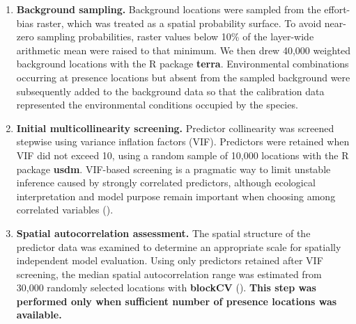 \documentclass[
  openany]{book}
\let\OldTexttt\texttt
\renewcommand{\texttt}[1]{%
  \OldTexttt{\small #1}%
}
\begin{document}
\begin{enumerate}
  \begin{enumerate}
  \def\labelenumii{\alph{enumii}.}
  \item
    Seasonal overlap between the focal species and each target-group species was quantified with \texttt{phenology\_overlap\_weights()}.
  \item
    Overlap between focal-species observation activity and grassland habitat-inventory dates was quantified with \texttt{doy\_kde\_weights()}.
  \item
    After applying target-group-specific temporal weights, group-specific sampling-density surfaces were generated with \texttt{kde\_surface()}. These functions are implemented in the R package \textbf{sdmhelpers} ().
  \end{enumerate}
\item
  \textbf{Background sampling.} Background locations were sampled from the effort-bias raster, which was treated as a spatial probability surface. To avoid near-zero sampling probabilities, raster values below 10\% of the layer-wide arithmetic mean were raised to that minimum. We then drew 40,000 weighted background locations with the R package \textbf{terra}. Environmental combinations occurring at presence locations but absent from the sampled background were subsequently added to the background data so that the calibration data represented the environmental conditions occupied by the species.
\item
  \textbf{Initial multicollinearity screening.} Predictor collinearity was screened stepwise using variance inflation factors (VIF). Predictors were retained when VIF did not exceed 10, using a random sample of 10,000 locations with the R package \textbf{usdm}. VIF-based screening is a pragmatic way to limit unstable inference caused by strongly correlated predictors, although ecological interpretation and model purpose remain important when choosing among correlated variables ().
\item
  \textbf{Spatial autocorrelation assessment.} The spatial structure of the predictor data was examined to determine an appropriate scale for spatially independent model evaluation. Using only predictors retained after VIF screening, the median spatial autocorrelation range was estimated from 30,000 randomly selected locations with \textbf{blockCV} (). \textbf{This step was performed only when sufficient number of presence locations was available.}

\end{enumerate}
\end{document}
